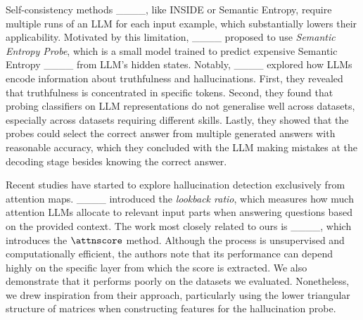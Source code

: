Self-consistency methods ____, like INSIDE or Semantic Entropy, require multiple runs of an LLM for each input example, which substantially lowers their applicability. Motivated by this limitation, ____ proposed to use \textit{Semantic Entropy Probe}, which is a small model trained to predict expensive Semantic Entropy ____ from LLM's hidden states. Notably, ____ explored how LLMs encode information about truthfulness and hallucinations. First, they revealed that truthfulness is concentrated in specific tokens. Second, they found that probing classifiers on LLM representations do not generalise well across datasets, especially across datasets requiring different skills. Lastly, they showed that the probes could select the correct answer from multiple generated answers with reasonable accuracy, which they concluded with the LLM making mistakes at the decoding stage besides knowing the correct answer.

Recent studies have started to explore hallucination detection exclusively from attention maps. ____ introduced the \textit{lookback ratio}, which measures how much attention LLMs allocate to relevant input parts when answering questions based on the provided context. The work most closely related to ours is ____, which introduces the $\attnscore$ method. Although the process is unsupervised and computationally efficient, the authors note that its performance can depend highly on the specific layer from which the score is extracted. We also demonstrate that it performs poorly on the datasets we evaluated. Nonetheless, we drew inspiration from their approach, particularly using the lower triangular structure of matrices when constructing features for the hallucination probe.